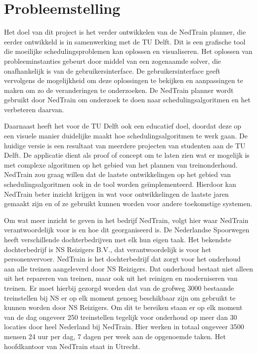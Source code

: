 \section{Probleemstelling}
\label{sec:probleemstelling}

Het doel van dit project is het verder ontwikkelen van de NedTrain planner, die eerder ontwikkeld is in samenwerking met de TU Delft. Dit is een grafische tool die moeilijke schedulingsproblemen kan oplossen en visualiseren. Het oplossen van probleeminstanties gebeurt door middel van een zogenaamde solver, die onafhankelijk is van de gebruikersinterface. De gebruikersinterface geeft vervolgens de mogelijkheid om deze oplossingen te bekijken en aanpassingen te maken om zo de veranderingen te onderzoeken. De NedTrain planner wordt gebruikt door NedTrain om onderzoek te doen naar schedulingsalgoritmen en het verbeteren daarvan.

Daarnaast heeft het voor de TU Delft ook een educatief doel, doordat deze op een visuele manier duidelijke maakt hoe schedulingsalgoritmen te werk gaan. De huidige versie is een resultaat van meerdere projecten van studenten aan de TU Delft. De applicatie dient als proof of concept om te laten zien wat er mogelijk is met complexe algoritmen op het gebied van het plannen van treinonderhoud.
NedTrain zou graag willen dat de laatste ontwikkelingen op het gebied van schedulingsalgoritmen ook in de tool worden ge\"implementeerd. Hierdoor kan NedTrain beter inzicht krijgen in wat voor ontwikkelingen de laatste jaren gemaakt zijn en of ze gebruikt kunnen worden voor andere toekomstige systemen.

Om wat meer inzicht te geven in het bedrijf NedTrain, volgt hier waar NedTrain verantwoordelijk voor is en hoe dit georganiseerd is.
De Nederlandse Spoorwegen heeft verschillende dochterbedrijven met elk hun eigen taak. Het bekendste dochterbedrijf is NS Reizigers B.V., dat verantwoordelijk is voor het personenvervoer. NedTrain is het dochterbedrijf dat zorgt voor het onderhoud aan alle treinen aangeleverd door NS Reizigers. Dat onderhoud bestaat niet alleen uit het repareren van treinen, maar ook uit het reinigen en moderniseren van treinen. Er moet hierbij gezorgd worden dat van de grofweg 3000 bestaande treinstellen bij NS er op elk moment genoeg beschikbaar zijn om gebruikt te kunnen worden door NS Reizigers. Om dit te bereiken staan er op elk moment van de dag ongeveer 250 treinstellen tegelijk voor onderhoud op meer dan 30 locaties door heel Nederland bij NedTrain. Hier werken in totaal ongeveer 3500 mensen 24 uur per dag, 7 dagen per week aan de opgenoemde taken. Het hoofdkantoor van NedTrain staat in Utrecht.
